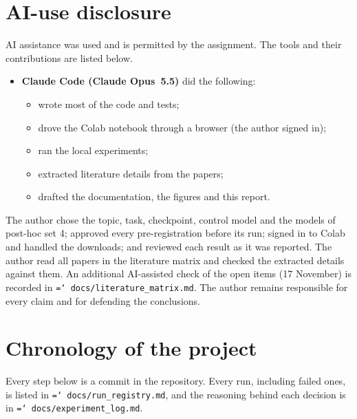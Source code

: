 \documentclass[11pt,a4paper]{article}
\newcommand{\file}[1]{\texttt{\small\hyphenchar\font=`\/ #1}}
\begin{document}
\section{AI-use disclosure}
\label{app:ai}
AI assistance was used and is permitted by the assignment. The tools and their contributions are listed below.
\begin{itemize}
  \item \textbf{Claude Code (Claude Opus~5.5)} did the following:
  \begin{itemize}
    \item wrote most of the code and tests;
    \item drove the Colab notebook through a browser (the author signed in);
    \item ran the local experiments;
    \item extracted literature details from the papers;
    \item drafted the documentation, the figures and this report.
  \end{itemize}
\end{itemize}
The author chose the topic, task, checkpoint, control model and the models of post-hoc set 4; approved every pre-registration before its run; signed in to Colab and handled the downloads; and reviewed each result as it was reported. The author read all papers in the literature matrix and checked the extracted details against them. An additional AI-assisted check of the open items (17 November) is recorded in \file{docs/literature\_matrix.md}. The author remains responsible for every claim and for defending the conclusions.

\section{Chronology of the project}
\label{app:chrono}
Every step below is a commit in the repository. Every run, including failed ones, is listed in \file{docs/run\_registry.md}, and the reasoning behind each decision is in \file{docs/experiment\_log.md}.
\end{document}
